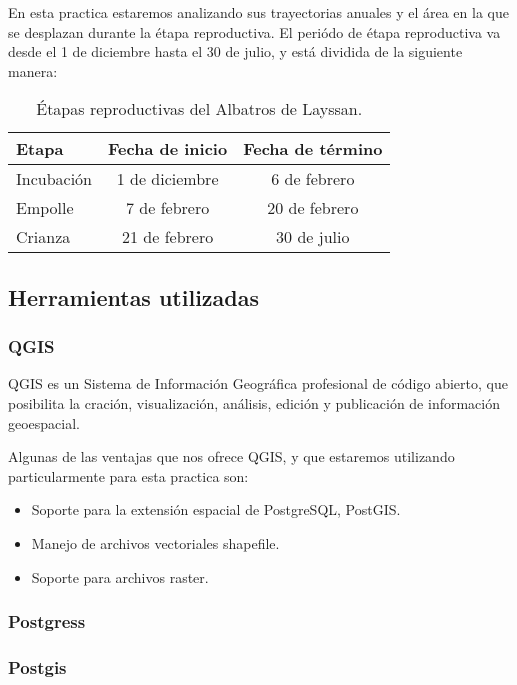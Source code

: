 \documentclass[a4paper, 11pt]{article}
\begin{document}
En esta practica estaremos analizando sus trayectorias anuales y el área en la
que se desplazan durante la étapa reproductiva. El periódo de étapa reproductiva
va desde el 1 de diciembre hasta el 30 de julio, y está dividida de la siguiente
manera:


\begin{table}[h!]
\caption{Étapas reproductivas del Albatros de Layssan.}
\begin{center}
\begin{tabular}{lcc}
    Etapa & Fecha de inicio & Fecha de término \\
    \hline
    Incubación & 1 de diciembre & 6 de febrero \\
    Empolle & 7 de febrero & 20 de febrero \\
    Crianza & 21 de febrero & 30 de julio
\end{tabular}
\end{center}
\end{table}


\subsection{Herramientas utilizadas}

\subsubsection{QGIS}
QGIS es un Sistema de Información Geográfica profesional de código abierto, que
posibilita la cración, visualización, análisis, edición y publicación de
información geoespacial.

Algunas de las ventajas que nos ofrece QGIS, y que estaremos utilizando
particularmente para esta practica son:

\begin{itemize}
    \item Soporte para la extensión espacial de PostgreSQL, PostGIS.
    \item Manejo de archivos vectoriales shapefile.
    \item Soporte para archivos raster.
\end{itemize}

\subsubsection{Postgress}

\subsubsection{Postgis}
\end{document}
